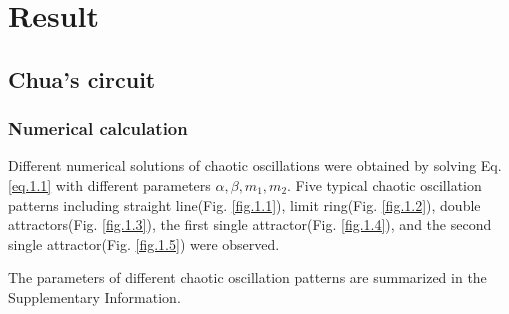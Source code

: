 \documentclass[10pt,a4paper,twocolumn,twoside,UTF8]{article}
\begin{document}
\section{Result}
	\subsection{Chua's circuit}
		\subsubsection{Numerical calculation}
			
			Different numerical solutions of chaotic oscillations were obtained by solving Eq. \ref{eq.1.1} with different parameters $\alpha, \beta, m_1, m_2$.
			Five typical chaotic oscillation patterns including 
			straight line(Fig. \ref{fig.1.1}), limit ring(Fig. \ref{fig.1.2}), double attractors(Fig. \ref{fig.1.3}), the first single attractor(Fig. \ref{fig.1.4}), and the second single attractor(Fig. \ref{fig.1.5}) 
			were observed.

			The parameters of different chaotic oscillation patterns are summarized in the Supplementary Information.
	
\end{document}
